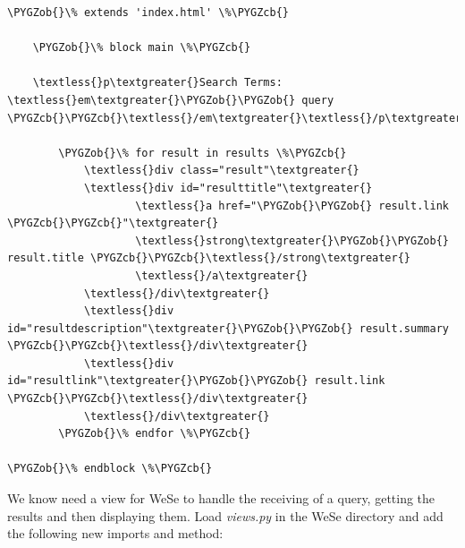 \documentclass[letterpaper,10pt,english]{sphinxmanual}
\def\PYGZob{\char`\{}
\def\PYGZcb{\char`\}}
\begin{document}
\begin{Verbatim}[commandchars=\\\{\}]
\PYGZob{}\% extends 'index.html' \%\PYGZcb{}

    \PYGZob{}\% block main \%\PYGZcb{}

    \textless{}p\textgreater{}Search Terms: \textless{}em\textgreater{}\PYGZob{}\PYGZob{} query \PYGZcb{}\PYGZcb{}\textless{}/em\textgreater{}\textless{}/p\textgreater{}

        \PYGZob{}\% for result in results \%\PYGZcb{}
            \textless{}div class="result"\textgreater{}
            \textless{}div id="resulttitle"\textgreater{}
                    \textless{}a href="\PYGZob{}\PYGZob{} result.link \PYGZcb{}\PYGZcb{}"\textgreater{}
                    \textless{}strong\textgreater{}\PYGZob{}\PYGZob{} result.title \PYGZcb{}\PYGZcb{}\textless{}/strong\textgreater{}
                    \textless{}/a\textgreater{}
            \textless{}/div\textgreater{}
            \textless{}div id="resultdescription"\textgreater{}\PYGZob{}\PYGZob{} result.summary \PYGZcb{}\PYGZcb{}\textless{}/div\textgreater{}
            \textless{}div id="resultlink"\textgreater{}\PYGZob{}\PYGZob{} result.link \PYGZcb{}\PYGZcb{}\textless{}/div\textgreater{}
            \textless{}/div\textgreater{}
        \PYGZob{}\% endfor \%\PYGZcb{}

\PYGZob{}\% endblock \%\PYGZcb{}
\end{Verbatim}

We know need a view for WeSe to handle the receiving of a query, getting the results and then displaying them. Load \emph{views.py} in the WeSe directory and add the following new imports and method:
\end{document}
